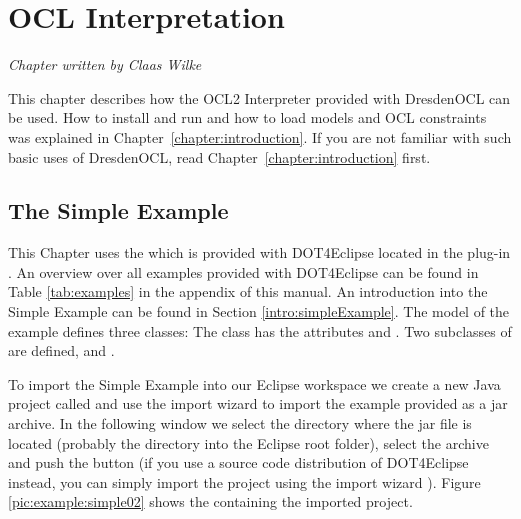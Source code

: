 \chapter{OCL Interpretation}
\label{chapter:interpretation}

\begin{flushright}
\textit{Chapter written by Claas Wilke}
\end{flushright}

This chapter describes how the \acs{OCL}2 Interpreter provided with DresdenOCL can be used. How to install and run  and how to load models and OCL constraints was explained in Chapter~\ref{chapter:introduction}. If you are not familiar with such basic uses of DresdenOCL, read Chapter~\ref{chapter:introduction} first.




\section{The Simple Example}

This Chapter uses the  which is provided with \acl{DOT4Eclipse} located in the plug-in . An overview over all examples provided with \acl{DOT4Eclipse} can be found in Table \ref{tab:examples} in the appendix of this manual. An introduction into the Simple Example can be found in Section \ref{intro:simpleExample}. The model of the example defines three classes: The class  has the attributes  and . Two subclasses of  are defined,  and .

To import the Simple Example into our Eclipse workspace we create a new Java project called  and use the import wizard  to import the example provided as a jar archive. In the following window we select the directory where the jar file is located (probably the  directory into the Eclipse root folder), select the archive  and push the  button (if you use a source code distribution of \acl{DOT4Eclipse} instead, you can simply import the project  using the import wizard ). Figure \ref{pic:example:simple02} shows the  containing the imported project.

